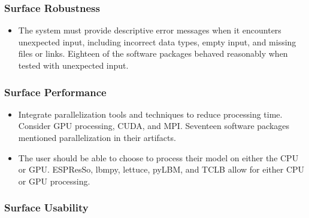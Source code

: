 \documentclass[12pt, notitlepage]{article}
\begin{document}
\subsubsection{Surface Robustness}

\begin{itemize}
	\item The system must provide descriptive error messages when it encounters unexpected input, including incorrect data types, empty input, and missing files or links. Eighteen of the software packages behaved reasonably when tested with unexpected input.
\end{itemize}

\subsubsection{Surface Performance}

\begin{itemize}
	\item Integrate parallelization tools and techniques to reduce processing time. Consider GPU processing, CUDA, and MPI. Seventeen software packages mentioned parallelization in their artifacts.
	\item The user should be able to choose to process their model on either the CPU or GPU. ESPResSo, lbmpy, lettuce, pyLBM, and TCLB allow for either CPU or GPU processing.
\end{itemize}

\subsubsection{Surface Usability}
\end{document}
